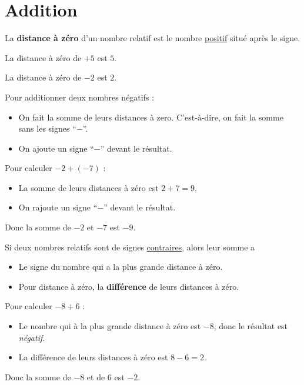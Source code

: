 \documentclass[../€Cours-complet/Cours-complet]{subfiles}
\begin{document}
\maketitleCours

\section{Addition}

\begin{greybox}[frametitle={Rappel}]
	La \textbf{distance à zéro} d'un nombre relatif est le nombre \uline{positif} situé après le signe.
\end{greybox}

\begin{exemple}
	La distance à zéro de $+5$ est $5$.

	La distance à zéro de $-2$ est $2$.
\end{exemple}

\begin{cours}
	Pour additionner deux nombres négatifs :
	\begin{itemize}
		\item On fait la somme de leurs distances à zero. C'est-à-dire, on fait la somme sans les signes “$-$”.
		\item On ajoute un signe “$-$” devant le résultat.
	\end{itemize}
\end{cours}

\begin{exemple}
	Pour calculer $-2 + (-7)$ :
	\begin{itemize}
		\item La somme de leurs distances à zéro est $2 + 7 = 9$.
		\item On rajoute un signe “$-$” devant le résultat.
	\end{itemize}
	Donc la somme de $-2$ et $-7$ est $-9$.
\end{exemple}

\begin{cours}
	Si deux nombres relatifs sont de signes \uline{contraires}, alors leur somme a
	\begin{itemize}
		\item Le signe du nombre qui a la plus grande distance à zéro.
		\item Pour distance à zéro, la \textbf{différence} de leurs distances à zéro.
	\end{itemize}
\end{cours}

\begin{exemple}
	Pour calculer $-8 + 6$ :
	\begin{itemize}
		\item Le nombre qui à la plus grande distance à zéro est $-8$, donc le résultat est \textit{négatif}.
		\item La différence de leurs distances à zéro est $8 - 6 = 2$.
	\end{itemize}
	Donc la somme de $-8$ et de $6$ est $-2$.
\end{exemple}
\end{document}
